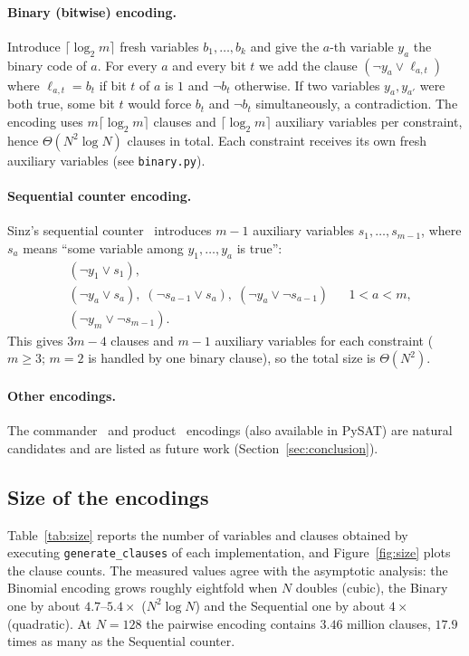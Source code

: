 \documentclass[a4paper,fleqn]{cas-sc}
\begin{document}
\paragraph{Binary (bitwise) encoding.}
Introduce $\lceil\log_2 m\rceil$ fresh variables $b_1,\dots,b_k$ and give the $a$-th variable $y_a$ the binary code of $a$.
For every $a$ and every bit $t$ we add the clause $(\lnot y_a\lor \ell_{a,t})$ where $\ell_{a,t}=b_t$ if bit $t$ of $a$ is $1$ and $\lnot b_t$ otherwise.
If two variables $y_a,y_{a'}$ were both true, some bit $t$ would force $b_t$ and $\lnot b_t$ simultaneously, a contradiction.
The encoding uses $m\lceil\log_2 m\rceil$ clauses and $\lceil\log_2 m\rceil$ auxiliary variables per constraint, hence $\Theta(N^2\log N)$ clauses in total.
Each constraint receives its own fresh auxiliary variables (see \texttt{binary.py}).

\paragraph{Sequential counter encoding.}
Sinz's sequential counter~\cite{sinz2005towards} introduces $m-1$ auxiliary variables $s_1,\dots,s_{m-1}$, where $s_a$ means ``some variable among $y_1,\dots,y_a$ is true'':
\begin{align}
 &(\lnot y_1\lor s_1),\\
 &(\lnot y_a\lor s_a),\;(\lnot s_{a-1}\lor s_a),\;(\lnot y_a\lor\lnot s_{a-1}) &&  1<a<m,\\
 &(\lnot y_m\lor\lnot s_{m-1}).
\end{align}
This gives $3m-4$ clauses and $m-1$ auxiliary variables for each constraint ($m\ge3$; $m=2$ is handled by one binary clause), so the total size is $\Theta(N^2)$.

\paragraph{Other encodings.}
The commander~\cite{klieber2007commander} and product~\cite{chen2010product} encodings (also available in PySAT) are natural candidates and are listed as future work (Section~\ref{sec:conclusion}).

\subsection{Size of the encodings}
Table~\ref{tab:size} reports the number of variables and clauses obtained by executing \texttt{generate\_clauses} of each implementation, and Figure~\ref{fig:size} plots the clause counts.
The measured values agree with the asymptotic analysis: the Binomial encoding grows roughly eightfold when $N$ doubles (cubic), the Binary one by about $4.7$--$5.4\times$ ($N^2\log N$) and the Sequential one by about $4\times$ (quadratic).
At $N=128$ the pairwise encoding contains $3.46$ million clauses, $17.9$ times as many as the Sequential counter.
\end{document}
